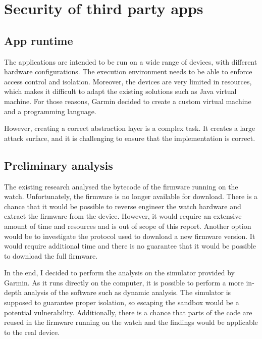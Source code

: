 
\chapter{Security of third party apps}

\section{App runtime}

The applications are intended to be run on a wide range of devices, with different hardware configurations.
The execution environment needs to be able to enforce access control and isolation.
Moreover, the devices are very limited in resources, which makes it difficult to adapt the existing solutions such as Java virtual machine.
For those reasons, Garmin decided to create a custom virtual machine and a programming language.

However, creating a correct abstraction layer is a complex task.
It creates a large attack surface, and it is challenging to ensure that the implementation is correct.

\section{Preliminary analysis}
The existing research analysed the bytecode of the firmware running on the watch.
Unfortunately, the firmware is no longer available for download.
There is a chance that it would be possible to reverse engineer the watch hardware and extract the firmware from the device.
However, it would require an extensive amount of time and resources and is out of scope of this report.
Another option would be to investigate the protocol used to download a new firmware version.
It would require additional time and there is no guarantee that it would be possible to download the full firmware.

In the end, I decided to perform the analysis on the simulator provided by Garmin.
As it runs directly on the computer, it is possible to perform a more in-depth analysis of the software such as dynamic analysis.
The simulator is supposed to guarantee proper isolation, so escaping the sandbox would be a potential vulnerability.
Additionally, there is a chance that parts of the code are reused in the firmware running on the watch and the findings would be applicable to the real device.

